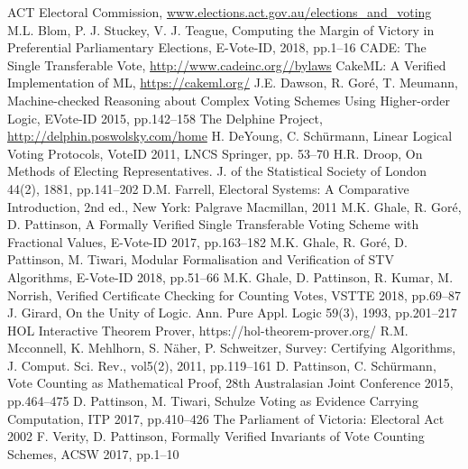 \documentclass[10pt,conference]{IEEEtran}
\begin{document}

\begin{thebibliography}{00}
ACT Electoral Commission, \url{www.elections.act.gov.au/elections\_and\_voting} 
M.L. Blom, P. J. Stuckey, V. J. Teague, Computing the Margin of Victory in Preferential Parliamentary Elections, E-Vote-ID, 2018, pp.1--16
CADE: The Single Transferable Vote, \url{http://www.cadeinc.org//bylaws} 
CakeML: A Verified Implementation of ML, \url{https://cakeml.org/}
J.E. Dawson, R. Gor{\'{e}}, T. Meumann, Machine-checked Reasoning about
  Complex Voting Schemes Using Higher-order Logic, EVote-ID 2015, pp.142--158
The Delphine Project, \url{http://delphin.poswolsky.com/home}
H. DeYoung, C. Sch{\"{u}}rmann, Linear Logical Voting Protocols, VoteID 2011, LNCS Springer, pp. 53--70
H.R. Droop, On Methods of Electing Representatives. J. of the Statistical
  Society of London  44(2), 1881, pp.141--202
D.M. Farrell, Electoral Systems: A Comparative Introduction, 2nd ed., New York: Palgrave Macmillan, 2011
M.K. Ghale, R. Gor{\'{e}}, D. Pattinson, A Formally Verified Single Transferable Voting Scheme with Fractional Values, E-Vote-ID 2017, pp.163--182
M.K. Ghale, R. Gor{\'{e}}, D. Pattinson, M. Tiwari,
 Modular Formalisation and Verification of STV Algorithms, E-Vote-ID 2018, pp.51--66
M.K. Ghale, D. Pattinson, R. Kumar, M. Norrish, Verified Certificate Checking for Counting Votes, VSTTE 2018, pp.69--87
J. Girard, On the Unity of Logic. Ann. Pure Appl. Logic  59(3), 1993, pp.201--217
HOL Interactive Theorem Prover, https://hol-theorem-prover.org/
R.M. Mcconnell, K. Mehlhorn, S. N\"{a}her, P. Schweitzer, Survey: Certifying Algorithms, J. Comput. Sci. Rev., vol5(2), 2011, pp.119--161
D. Pattinson, C. Sch{\"{u}}rmann, Vote Counting as Mathematical Proof, 28th Australasian Joint
  Conference 2015, pp.464--475
D. Pattinson, M. Tiwari, Schulze Voting as Evidence Carrying Computation, ITP 2017, pp.410--426
The Parliament of Victoria: Electoral Act 2002
F. Verity, D. Pattinson, Formally Verified Invariants of Vote Counting Schemes, ACSW 2017, pp.1--10 
\end{thebibliography}
\end{document}
